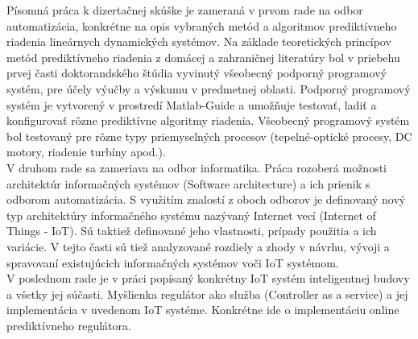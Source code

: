 Písomná práca k dizertačnej skúške je zameraná v prvom rade na odbor automatizácia, konkrétne na opis vybraných metód a algoritmov prediktívneho riadenia lineárnych dynamických systémov. Na základe teoretických princípov metód prediktívneho riadenia z domácej a zahraničnej literatúry bol v priebehu prvej časti doktorandského štúdia vyvinutý všeobecný podporný programový systém, pre účely výučby a výskumu v predmetnej oblasti.  Podporný programový systém je vytvorený v prostredí Matlab-Guide a umožňuje testovať, ladiť a konfigurovať rôzne prediktívne algoritmy riadenia. Všeobecný programový systém bol testovaný pre rôzne typy priemyselných procesov (tepelné-optické procesy, DC motory, riadenie turbíny apod.).\\
\indent V druhom rade sa zameriava na odbor informatika. Práca rozoberá možnosti architektúr informačných systémov (Software architecture) a ich prienik s odborom automatizácia. S využitím znalostí z oboch odborov je definovaný nový typ architektúry informačného systému nazývaný Internet vecí (Internet of Things - IoT). Sú taktiež definované jeho vlastnosti, prípady použitia a ich variácie. V tejto časti sú tiež analyzované rozdiely a zhody v návrhu, vývoji a spravovaní existujúcich informačných systémov voči IoT systémom.\\
\indent V poslednom rade je v práci popísaný konkrétny IoT systém inteligentnej budovy a všetky jej súčasti. Myšlienka regulátor ako služba (Controller as a service) a jej implementácia v uvedenom IoT systéme. Konkrétne ide o implementáciu online prediktívneho regulátora.